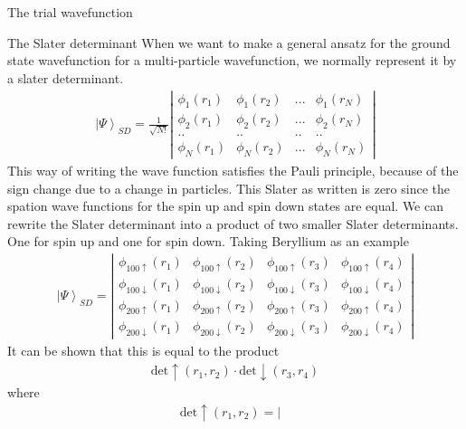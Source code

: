 \documentclass[a4paper, 12pt, titlepage]{article}
\begin{document}
\begin{section}{The trial wavefunction}
  
 \begin{subsection}{The Slater determinant}
  When we want to make a general ansatz for the ground state wavefunction for a multi-particle wavefunction, we normally represent it by a slater determinant. 
  \begin{align}
  	\left| \Psi \right>_{SD} = \frac{1}{\sqrt{N!}}\left| \begin{matrix}
  		 							 \phi_1 (r_1)  &  \phi_1 (r_2)  & ... &  \phi_1 (r_N)  \\
  		 							 \phi_2 (r_1)  &  \phi_2 (r_2)  & ... &  \phi_2 (r_N)  \\
  		 							.. & .. & .. & .. \\
  		 							 \phi_N (r_1)  & \phi_N (r_2)  & ... &  \phi_N (r_N)  
  	                            \end{matrix} \right|
  \end{align}
  This way of writing the wave function satisfies the Pauli principle, because of the sign change due to a change in particles. 
  This Slater as written is zero since the spation wave functions for the spin up and spin down states are equal. We can rewrite the Slater determinant into a product of two smaller Slater determinants. One for spin up and one for spin down. Taking Beryllium as an example
  \begin{align}
  	\left| \Psi \right>_{SD} = \left| \begin{matrix}
  		 							 \phi_{100 \uparrow} (r_1)  &  \phi_{100 \uparrow} (r_2)  & \phi_{100 \uparrow} (r_3) &  \phi_{100 \uparrow} (r_4)  \\
  		 							 \phi_{100 \downarrow} (r_1)  &  \phi_{100 \downarrow} (r_2)  & \phi_{100 \downarrow}(r_3) &  \phi_{100 \downarrow} (r_4)  \\
  		 							\phi_{200 \uparrow} (r_1)  &  \phi_{200 \uparrow} (r_2)  & \phi_{200 \uparrow} (r_3) &  \phi_{200 \uparrow} (r_4) \\
  		 							 \phi_{200 \downarrow} (r_1)  &  \phi_{200 \downarrow} (r_2)  & \phi_{200 \downarrow}(r_3) &  \phi_{200 \downarrow} (r_4) 
  	                            \end{matrix} \right|
  \end{align}
  It can be shown that this is equal to the product
  \begin{align}
  	\text{det}\uparrow(r_1,r_2) \cdot \text{det}\downarrow(r_3,r_4) 
  \end{align}
  where
  \begin{align}
  	\text{det}\uparrow(r_1,r_2) = \left| \begin{matrix}

\end{matrix}
\end{align}
\end{subsection}
\end{section}
\end{document}
